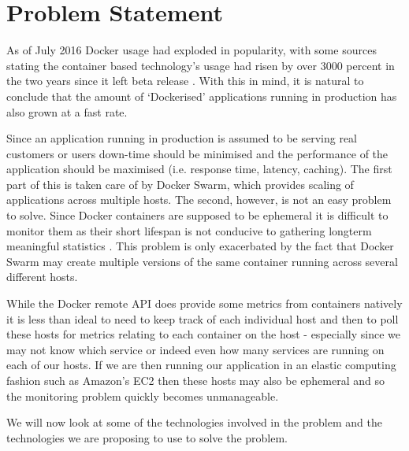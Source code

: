 \section{Problem Statement}
\label{sec:problem}
As of July 2016 Docker usage had exploded in popularity, with some sources stating the container based technology's usage had risen by over 3000 percent in the two years since it left beta release \citep{DockerUsage2016}. With this in mind, it is natural to conclude that the amount of `Dockerised' applications running in production has also grown at a fast rate.

Since an application running in production is assumed to be serving real customers or users down-time should be minimised and the performance of the application should be maximised (i.e. response time, latency, caching). The first part of this is taken care of by Docker Swarm, which provides scaling of applications across multiple hosts. The second, however, is not an easy problem to solve. Since Docker containers are supposed to be ephemeral it is difficult to monitor them as their short lifespan is not conducive to gathering longterm meaningful statistics \citep{DataDog2017}. This problem is only exacerbated by the fact that Docker Swarm may create multiple versions of the same container running across several different hosts. 

While the Docker remote API does provide some metrics from containers natively it is less than ideal to need to keep track of each individual host and then to poll these hosts for metrics relating to each container on the host - especially since we may not know which service or indeed even how many services are running on each of our hosts. If we are then running our application in an elastic computing fashion such as Amazon's EC2 then these hosts may also be ephemeral and so the monitoring problem quickly becomes unmanageable.

We will now look at some of the technologies involved in the problem and the technologies we are proposing to use to solve the problem.
